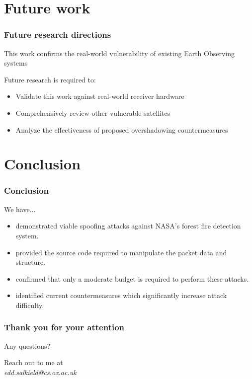 \documentclass[aspectratio=169]{beamer}
\begin{document}
\section{Future work}

\begin{frame}
  \frametitle{Future research directions}
  This work confirms the real-world vulnerability of existing Earth Observing systems

  \pause
  \vspace{0.5cm}
  Future research is required to:

  \pause
  \begin{itemize}[<+->]
    \item Validate this work against real-world receiver hardware
    \item Comprehensively review other vulnerable satellites
    \item Analyze the effectiveness of proposed overshadowing countermeasures
  \end{itemize}

\end{frame}

\section{Conclusion}

\begin{frame}
  \frametitle{Conclusion}

  We have...
  \pause
  \begin{itemize}[<+->]
    \item demonstrated viable spoofing attacks against NASA's forest fire detection system.
    \item provided the source code required to manipulate the packet data and structure.
    \item confirmed that only a moderate budget is required to perform these attacks.
    \item identified current countermeasures which significantly increase attack difficulty.
  \end{itemize}
\end{frame}

\begin{frame}
  \frametitle{Thank you for your attention}

  \begin{center}
    \Large
    Any questions?
  \end{center}
  \vspace{0.6cm}

  \begin{center}
    Reach out to me at \\
    \textit{edd.salkield@cs.ox.ac.uk}
  \end{center}
\end{frame}
\end{document}
